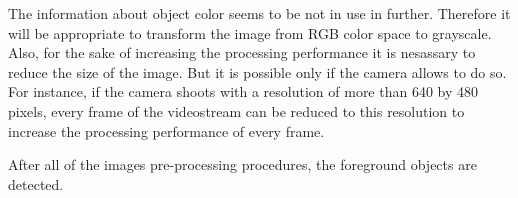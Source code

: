 \documentclass[12pt,a4paper,oneside,titlepage]{article}
\begin{document}
The information about object color seems to be not in use in further.
Therefore it will be appropriate to transform the image from RGB color space to grayscale.
Also, for the sake of increasing the processing performance it is nesassary to reduce the size of the image.
But it is possible only if the camera allows to do so.
For instance, if the camera shoots with a resolution of more than 640 by 480 pixels, every frame of the videostream can be reduced to this resolution to increase the processing performance of every frame.

After all of the images pre-processing procedures, the foreground objects are detected.


\end{document}
